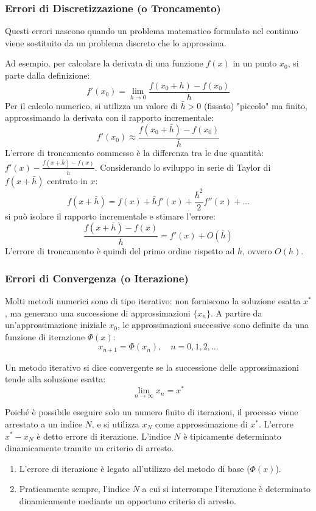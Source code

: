 \subsubsection{Errori di Discretizzazione (o Troncamento)}
Questi errori nascono quando un problema matematico formulato nel continuo viene sostituito da un problema discreto che lo approssima.

Ad esempio, per calcolare la derivata di una funzione $f(x)$ in un punto $x_0$, si parte dalla definizione:
$$ f'(x_0) = \lim_{h \to 0} \frac{f(x_0+h) - f(x_0)}{h} $$
Per il calcolo numerico, si utilizza un valore di $\bar{h}>0$ (fissato) "piccolo" ma finito, approssimando la derivata con il rapporto incrementale:
$$ f'(x_0) \approx \frac{f(x_0+\bar{h}) - f(x_0)}{\bar{h}} $$
L'errore di troncamento commesso è la differenza tra le due quantità: $f'(x) - \frac{f(x+\bar{h})-f(x)}{\bar{h}}$.
Considerando lo sviluppo in serie di Taylor di $f(x+\bar{h})$ centrato in $x$:
$$ f(x+\bar{h}) = f(x) + \bar{h} f'(x) + \frac{\bar{h}^2}{2} f''(x) + \dots $$
si può isolare il rapporto incrementale e stimare l'errore:
$$ \frac{f(x+\bar{h}) - f(x)}{\bar{h}} = f'(x) + O(\bar{h}) $$
L'errore di troncamento è quindi del primo ordine rispetto ad $h$, ovvero $O(h)$.



\subsubsection{Errori di Convergenza (o Iterazione)}
Molti metodi numerici sono di tipo iterativo: non forniscono la soluzione esatta $x^*$, ma generano una successione di approssimazioni $\{x_n\}$. A partire da un'approssimazione iniziale $x_0$, le approssimazioni successive sono definite da una funzione di iterazione $\Phi(x)$:
$$ x_{n+1} = \Phi(x_n), \quad n=0, 1, 2, \dots $$

\begin{definition}
Un metodo iterativo si dice convergente se la successione delle approssimazioni tende alla soluzione esatta:
$$ \lim_{n \to \infty} x_n = x^* $$
\end{definition}

Poiché è possibile eseguire solo un numero finito di iterazioni, il processo viene arrestato a un indice $N$, e si utilizza $x_N$ come approssimazione di $x^*$. L'errore $x^* - x_N$ è detto errore di iterazione. L'indice $N$ è tipicamente determinato dinamicamente tramite un criterio di arresto.

\begin{osservazione}
    \begin{enumerate}
        \item L'errore di iterazione è legato all'utilizzo del metodo di base ($\Phi(x)$).
        \item Praticamente sempre, l'indice $N$ a cui si interrompe l'iterazione è determinato dinamicamente mediante un opportuno criterio di arresto.
    \end{enumerate}
\end{osservazione}

